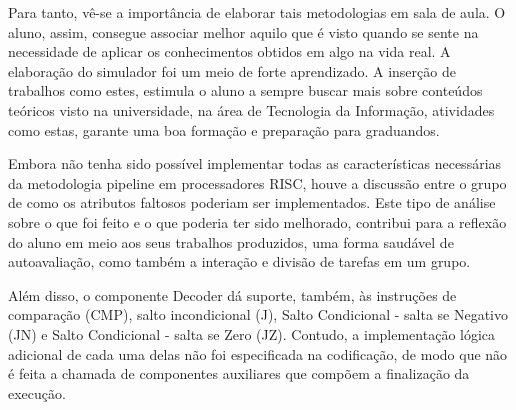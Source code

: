 \documentclass[12pt]{article}
\begin{document}
Para tanto, vê-se a importância de elaborar tais metodologias em sala de aula. O aluno, assim, consegue associar melhor aquilo que é visto quando se sente na necessidade de aplicar os conhecimentos obtidos em algo na vida real. A elaboração do simulador foi um meio de forte aprendizado. A inserção de trabalhos como estes, estimula o aluno a sempre buscar mais sobre conteúdos teóricos visto na universidade, na área de Tecnologia da Informação, atividades como estas, garante uma boa formação e preparação para graduandos.

Embora não tenha sido possível implementar todas as características necessárias da metodologia pipeline em processadores RISC, houve a discussão entre o grupo de como os atributos faltosos poderiam ser implementados. Este tipo de análise sobre o que foi feito e o que poderia ter sido melhorado, contribui para a reflexão do aluno em meio aos seus trabalhos produzidos, uma forma saudável de autoavaliação, como também a interação e divisão de tarefas em um grupo.

Além disso, o componente Decoder dá suporte, também, às instruções de comparação (CMP), salto incondicional (J), Salto Condicional - salta se Negativo (JN) e Salto Condicional - salta se Zero (JZ). Contudo, a implementação lógica adicional de cada uma delas não foi especificada na codificação, de modo que não é feita a chamada de componentes auxiliares que compõem a finalização da execução.
\end{document}

